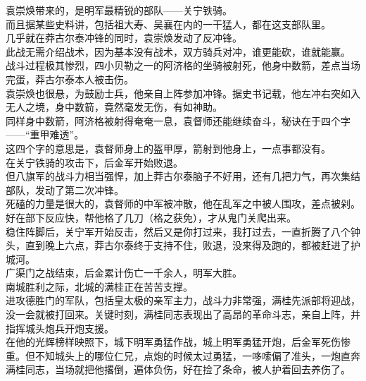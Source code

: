 \begin{multicols}{\theparacolNo}
袁崇焕带来的，是明军最精锐的部队——关宁铁骑。\\

而且据某些史料讲，包括祖大寿、吴襄在内的一干猛人，都在这支部队里。\\

几乎就在莽古尔泰冲锋的同时，袁崇焕发动了反冲锋。\\

此战无需介绍战术，因为基本没有战术，双方骑兵对冲，谁更能砍，谁就能赢。\\

战斗过程极其惨烈，四小贝勒之一的阿济格的坐骑被射死，他身中数箭，差点当场完蛋，莽古尔泰本人被击伤。\\

袁崇焕也很悬，为鼓励士兵，他亲自上阵参加冲锋。据史书记载，他左冲右突如入无人之境，身中数箭，竟然毫发无伤，有如神助。\\

同样身中数箭，阿济格被射得奄奄一息，袁督师还能继续奋斗，秘诀在于四个字——“重甲难透”。\\

这四个字的意思是，袁督师身上的盔甲厚，箭射到他身上，一点事都没有。\\

在关宁铁骑的攻击下，后金军开始败退。\\

但八旗军的战斗力相当强悍，加上莽古尔泰脑子不好用，还有几把力气，再次集结部队，发动了第二次冲锋。\\

死磕的力量是很大的，袁督师的中军被冲散，他在乱军之中被人围攻，差点被剁。好在部下反应快，帮他格了几刀（格之获免），才从鬼门关爬出来。\\

稳住阵脚后，关宁军开始反击，然后又是你打过来，我打过去，一直折腾了八个钟头，直到晚上六点，莽古尔泰终于支持不住，败退，没来得及跑的，都被赶进了护城河。\\

广渠门之战结束，后金累计伤亡一千余人，明军大胜。\\

南城胜利之际，北城的满桂正在苦苦支撑。\\

进攻德胜门的军队，包括皇太极的亲军主力，战斗力非常强，满桂先派部将迎战，没一会就被打回来。关键时刻，满桂同志表现出了高昂的革命斗志，亲自上阵，并指挥城头炮兵开炮支援。\\

在他的光辉榜样映照下，城下明军勇猛作战，城上明军勇猛开炮，后金军死伤惨重。但不知城头上的哪位仁兄，点炮的时候太过勇猛，一哆嗦偏了准头，一炮直奔满桂同志，当场就把他撂倒，遍体负伤，好在捡了条命，被人护着回去养伤了。\\


\end{multicols}
